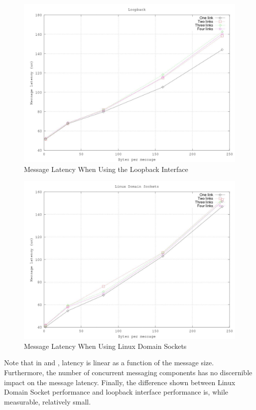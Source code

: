 \begin{figure}[H]
  \centering
  \includegraphics[width=120mm]{optimization/loop_msg.jpg}
  \caption{Message Latency When Using the Loopback Interface}
  \label{figure:loopLatency}
\end{figure}

\begin{figure}[H]
  \centering
  \includegraphics[width=120mm]{optimization/lds_msg.jpg}
  \caption{Message Latency When Using Linux Domain Sockets}
  \label{figure:ldsLatency}
\end{figure}

Note that in  and , latency is linear as a function of the message size. Furthermore, the number of concurrent messaging components has no discernible impact on the message latency. Finally, the difference shown between Linux Domain Socket performance and loopback interface performance is, while measurable, relatively small.


